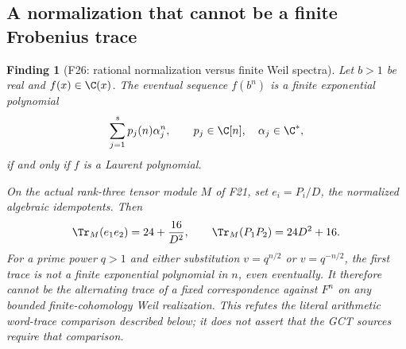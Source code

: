 \documentclass[11pt,a4paper]{article}
\newcommand{\fid}[1]{\textsf{#1}}\newcommand{\gate}[1]{\textsf{#1}}
\theoremstyle{named}\newtheorem{finding}{Finding}[section]
\theoremstyle{definition}\newtheorem{definition}[finding]{Definition}
\theoremstyle{remark}\newtheorem{remark}[finding]{Remark}
\begin{document}
\subsection{A normalization that cannot be a finite Frobenius trace}
\begin{finding}[\fid{F26}: rational normalization versus finite Weil spectra]\label{f:normalizedtrace}
Let $b>1$ be real and $f(x)\in\C(x)$. The eventual sequence $f(b^n)$ is
a finite exponential polynomial
\[
 \sum_{j=1}^s p_j(n)\alpha_j^n,
 \qquad p_j\in\C[n],\quad \alpha_j\in\C^*,
\]
if and only if $f$ is a Laurent polynomial.

On the \emph{actual} rank-three tensor module $M$ of \fid{F21}, set
$e_i=P_i/D$, the normalized algebraic idempotents. Then
\[
 \Tr_M(e_1e_2)=24+\frac{16}{D^2},\qquad
 \Tr_M(P_1P_2)=24D^2+16.
\]
For a prime power $q>1$ and either substitution $v=q^{n/2}$ or $v=q^{-n/2}$, the first trace
is not a finite exponential polynomial in $n$, even eventually.
It therefore cannot be the alternating trace of a fixed correspondence
against $F^n$ on any bounded finite-cohomology Weil realization.
This refutes the literal arithmetic word-trace comparison described
below; it does not assert that the GCT sources require that comparison.
\end{finding}
\end{document}
